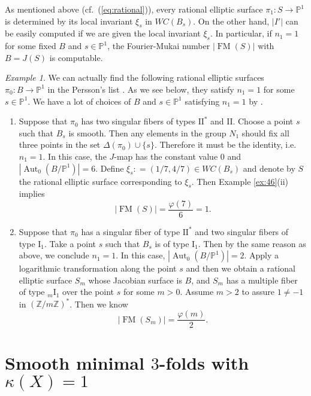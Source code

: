 \documentclass[a4paper,11pt]{article}
\theoremstyle{definition}\newtheorem{defn}[thm]{Definition}
\theoremstyle{remark}\newtheorem{remark}[thm]{Remark}
\newtheorem{ex}[thm]{Example}
\numberwithin{equation}{section}
\newcommand{\Aut}{\ensuremath{\operatorname{Aut}}}
\newcommand{\FM}{\operatorname{FM}}
\newcommand{\rom}{\textrm}
\newcommand{\PP}{\mathbb P}
\newcommand{\Z}{\mathbb Z}
\begin{document}
As mentioned above (cf.~(\ref{eq:rational})), every rational  
elliptic surface $\pi_1\colon S\to \PP^1$ is determined by its local 
invariant $\xi_s$ in $WC(B_s)$.  
On the other hand, $|I'|$ can be easily computed 
if we are given the local invariant $\xi_s$. 
In particular, if $n_1=1$ for some fixed $B$ and $s\in \PP^1$, 
the Fourier-Mukai number
$|\FM(S)|$ with $B=J(S)$ is computable. 


\begin{ex}
We can actually find the following rational  
elliptic surfaces $\pi _0\colon B\to \PP^1$ 
in the Persson's list \cite{Pe90}.
As we see below, they satisfy $n_1=1$ for some $s\in\PP^1$. 
We have a lot of choices of $B$ and $s\in \PP^1$ 
satisfying $n_1=1$ by \cite{Pe90}.
% 
\begin{enumerate}
\item
Suppose that $\pi_0$ has two singular fibers of types $\rom{II}^*$ and $\rom{II}$.
Choose a point $s$ such that $B_s$ is smooth. 
Then any elements in the group $N_1$ should fix all three points in the set
 $\Delta(\pi_0)\cup \{s\}$.
Therefore it must be the identity, i.e. $n_1=1$. In this case, the $J$-map has the constant
 value $0$ and $|\Aut _0(B/\PP^1)|=6$.
Define $\xi_s: =(1/7,4/7)\in WC(B_s)$ and denote by $S$
the rational  elliptic surface
 corresponding to $\xi_s$. Then Example \ref{ex:46}(ii) implies 
$$
|\FM (S)|=\frac{\varphi (7)}{6}=1.
$$ 
\item
Suppose that $\pi_0$ has a singular fiber of type $\rom{II}^*$ and two singular fibers of
type $\rom{I}_1$. Take a point $s$ such that $B_s$ is of type $\rom{I}_1$.
Then by the same reason as above, we conclude $n_1=1$.
In this case, $|\Aut _0(B/\PP^1)|=2$. Apply a logarithmic transformation
along the point $s$ and then we obtain 
a rational  elliptic surface $S_m$ whose Jacobian surface is $B$,
and $S_m$ has a multiple fiber of type $_m\rom{I}_1$ over the point $s$ 
for some $m>0$.
Assume $m>2$ to assure $1\ne -1$ in $(\Z/m\Z)^*$. Then we know  
$$
|\FM (S_m)|=\frac{\varphi (m)}{2}.
$$ 

\end{enumerate}
\end{ex}

\section{Smooth minimal  $3$-folds with $\kappa (X)=1$}\label{section:3folds}
\end{document}
